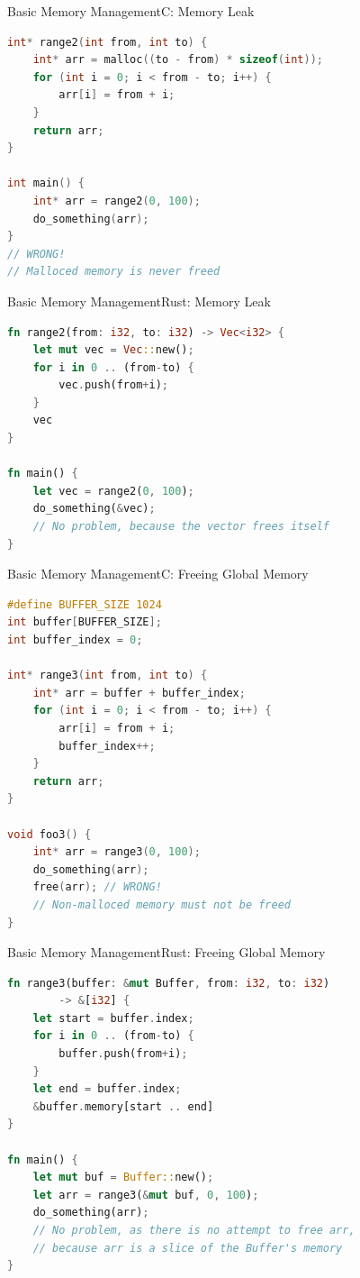 \begin{Frame}[fragile]{Basic Memory Management}{C: Memory Leak}
\begin{lstlisting}[language=C]
int* range2(int from, int to) {
    int* arr = malloc((to - from) * sizeof(int));
    for (int i = 0; i < from - to; i++) {
        arr[i] = from + i;
    }
    return arr;
}

int main() {
    int* arr = range2(0, 100);
    do_something(arr);
}
// WRONG!
// Malloced memory is never freed
\end{lstlisting}
\end{Frame}

\begin{Frame}[fragile]{Basic Memory Management}{Rust: Memory Leak}
\begin{lstlisting}[language=Rust]
fn range2(from: i32, to: i32) -> Vec<i32> {
    let mut vec = Vec::new();
    for i in 0 .. (from-to) {
        vec.push(from+i);
    }
    vec
}

fn main() {
    let vec = range2(0, 100);
    do_something(&vec);
    // No problem, because the vector frees itself
}
\end{lstlisting}
\end{Frame}

\begin{Frame}[fragile]{Basic Memory Management}{C: Freeing Global Memory}
\begin{lstlisting}[language=C]
#define BUFFER_SIZE 1024
int buffer[BUFFER_SIZE];
int buffer_index = 0;

int* range3(int from, int to) {
    int* arr = buffer + buffer_index;
    for (int i = 0; i < from - to; i++) {
        arr[i] = from + i;
        buffer_index++;
    }
    return arr;
}

void foo3() {
    int* arr = range3(0, 100);
    do_something(arr);
    free(arr); // WRONG!
    // Non-malloced memory must not be freed
}
\end{lstlisting}
\end{Frame}

\begin{Frame}[fragile]{Basic Memory Management}{Rust: Freeing Global Memory}
\begin{lstlisting}[language=Rust]
fn range3(buffer: &mut Buffer, from: i32, to: i32)
        -> &[i32] {
    let start = buffer.index;
    for i in 0 .. (from-to) {
        buffer.push(from+i);
    }
    let end = buffer.index;
    &buffer.memory[start .. end]
}

fn main() {
    let mut buf = Buffer::new();
    let arr = range3(&mut buf, 0, 100);
    do_something(arr);
    // No problem, as there is no attempt to free arr,
    // because arr is a slice of the Buffer's memory
}
\end{lstlisting}
\end{Frame}

